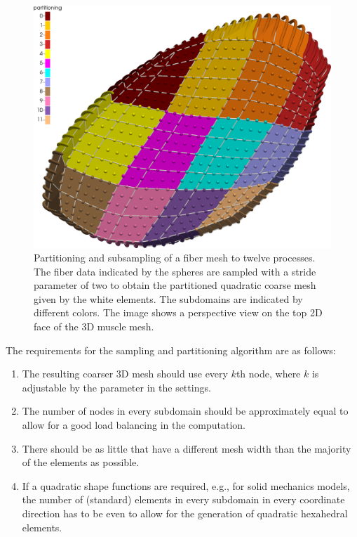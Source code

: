 \begin{figure}
  \centering%
  \includegraphics[width=\textwidth]{images/implementation/partitioning7.png}%
  \caption{Partitioning and subsampling of a fiber mesh to twelve processes. The fiber data indicated by the spheres are sampled with a stride parameter of two to obtain the partitioned quadratic coarse mesh given by the white elements. The subdomains are indicated by different colors. The image shows a perspective view on the top 2D face of the 3D muscle mesh.}%
  \label{fig:partitioning1}%
\end{figure}%

The requirements for the sampling and partitioning algorithm are as follows: 
\begin{enumerate}[label=(\roman*)]
\item The resulting coarser 3D mesh should use every $k$th node, where $k$ is adjustable by the parameter  in the settings.
\item The number of nodes in every subdomain should be approximately equal to allow for a good load balancing in the computation.
\item There should be as little  that have a different mesh width than the majority of the elements as possible.
\item If a quadratic shape functions are required, e.g., for solid mechanics models, the number of (standard) elements in every subdomain in every coordinate direction has to be even to allow for the generation of quadratic hexahedral elements.
\end{enumerate}

